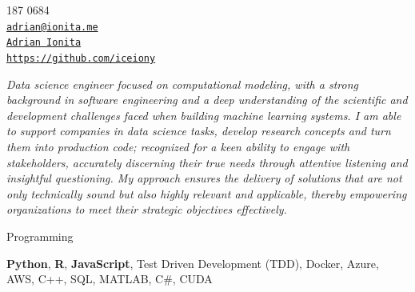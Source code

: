 \documentclass[11pt,article,oneside]{memoir}
\makeatletter
\def\myauthor{Adrian Ionita}
\def\myemail{adrian@ionita.me}
\def\myweb{https://github.com/iceiony}
\def\myphone{0797 187 0684}
\def\mytwitter{@iceiony}
\def\mylinkedin{https://uk.linkedin.com/in/adrian-ionita-6a923129}
\makeatother
\begin{document}
%
\hfill
\begin{minipage}[t]{1.3in}
  \flushright \footnotesize  \contactblock \myphone \, \faPhone \\ 
  {\scriptsize  \texttt{\href{mailto:\myemail}{\myemail}} \, \faEnvelope} \\
  {\scriptsize  \texttt{\href{\mylinkedin}{\myauthor}} \, \faLinkedinSquare }  \\ 
  {\scriptsize  \texttt{\href{\myweb}{\myweb}} \, \faGithub}
\end{minipage}

{\vskip -0.8cm}
\reversemarginpar

\bigskip      
\medskip

\noindent\emph{Data science engineer focused on computational modeling, with a strong background in software engineering and a deep understanding of the scientific and development challenges faced when building machine learning systems.
I am able to support companies in data science tasks, develop research concepts and turn them into production code; recognized for a keen ability to engage with stakeholders, accurately discerning their true needs through attentive listening and insightful questioning.
My approach ensures the delivery of solutions that are not only technically sound but also highly relevant and applicable, thereby empowering organizations to meet their strategic objectives effectively.
}
\bigskip


\ind Programming

\ind \hspace{0.354in} \footnotesize \textbf{Python}, \textbf{R}, \textbf{JavaScript}, Test Driven Development (TDD), Docker, Azure, AWS, C++, SQL, MATLAB, C\#, CUDA \normalsize 
\end{document}
